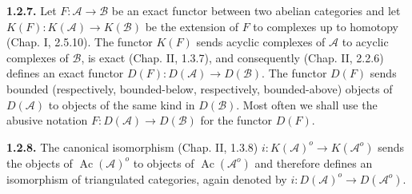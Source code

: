 \medskip\noindent\textbf{1.2.7.}\quad
Let $F\colon\mathcal A\longrightarrow\mathcal B$ be an exact functor between
two abelian categories and let
$K(F)\colon K(\mathcal A)\longrightarrow K(\mathcal B)$ be the extension of
$F$ to complexes up to homotopy (Chap. I, 2.5.10). The functor $K(F)$ sends
acyclic complexes of $\mathcal A$ to acyclic complexes of $\mathcal B$, is
exact (Chap. II, 1.3.7), and consequently (Chap. II, 2.2.6) defines an exact
functor $D(F)\colon D(\mathcal A)\longrightarrow D(\mathcal B)$. The functor
$D(F)$ sends bounded (respectively, bounded-below, respectively,
bounded-above) objects of $D(\mathcal A)$ to objects of the same kind in
$D(\mathcal B)$. Most often we shall use the abusive notation
$F\colon D(\mathcal A)\longrightarrow D(\mathcal B)$ for the functor
$D(F)$.

\medskip\noindent\textbf{1.2.8.}\quad
The canonical isomorphism (Chap. II, 1.3.8)
$i\colon K(\mathcal A)^o\longrightarrow K(\mathcal A^o)$ sends the objects
of $\operatorname{Ac}(\mathcal A)^o$ to objects of
$\operatorname{Ac}(\mathcal A^o)$ and therefore defines an isomorphism of
triangulated categories, again denoted by
$i\colon D(\mathcal A)^o\longrightarrow D(\mathcal A^o)$.
\endgroup
